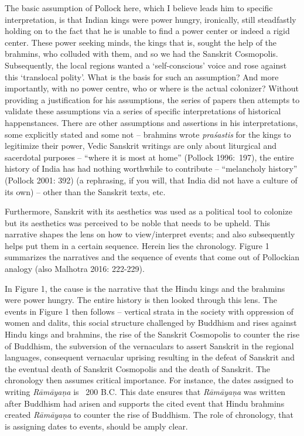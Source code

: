 The basic assumption of Pollock here, which I believe leads him to specific interpretation, is that Indian kings were power hungry, ironically, still steadfastly holding on to the fact that he is unable to find a power center or indeed a rigid center. These power seeking minds, the kings that is, sought the help of the brahmins, who colluded with them, and so we had the Sanskrit Cosmopolis. Subsequently, the local regions wanted a ‘self-conscious’ voice and rose against this ‘translocal polity’. What is the basis for such an assumption? And more importantly, with no power centre, who or where is the actual colonizer? Without providing a justification for his assumptions, the series of papers then attempts to validate these assumptions via a series of specific interpretations of historical happenstances. There are other assumptions and assertions in his interpretations, some explicitly stated and some not – brahmins wrote \textit{praśastis} for the kings to legitimize their power, Vedic Sanskrit writings are only about liturgical and sacerdotal purposes – “where it is most at home” (Pollock 1996:~197), the entire history of India has had nothing worthwhile to contribute – “melancholy history” (Pollock 2001: 392) (a rephrasing, if you will, that India did not have a culture of its own) – other than the Sanskrit texts, etc.

Furthermore, Sanskrit with its aesthetics was used as a political tool to colonize but its aesthetics was perceived to be noble that needs to be upheld. This narrative shapes the lens on how to view/interpret events; and also subsequently helps put them in a certain sequence. Herein lies the chronology. Figure 1 summarizes the narratives and the sequence of events that come out of Pollockian analogy (also Malhotra 2016: 222-229).

In Figure 1, the cause is the narrative that the Hindu kings and the brahmins were power hungry. The entire history is then looked through this lens. The events in Figure 1 then follows – vertical strata in the society with oppression of women and dalits, this social structure challenged by Buddhism and rises against Hindu kings and brahmins, the rise of the Sanskrit Cosmopolis to counter the rise of Buddhism, the subversion of the vernaculars to assert Sanskrit in the regional languages, consequent vernacular uprising resulting in the defeat of Sanskrit and the eventual death of Sanskrit Cosmopolis and the death of Sanskrit. The chronology then assumes critical importance. For instance, the dates assigned to writing \textit{Rāmāyaṇa} is ~200 B.C. This date ensures that \textit{Rāmāyaṇa} was written after Buddhism had arisen and supports the cited event that Hindu brahmins created \textit{Rāmāyaṇa} to counter the rise of Buddhism. The role of chronology, that is assigning dates to events, should be amply clear.

